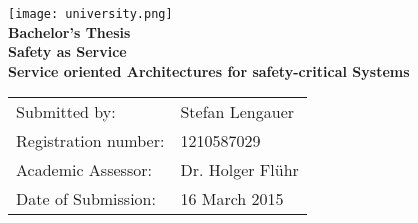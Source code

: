 \begin{titlepage}
	\begin{center}

		\texttt{[image: university.png]}\\
		\vspace*{5cm}
		\LARGE
		\textbf{Bachelor's Thesis}\\
		\vspace{1.5cm}
		\Huge
		\textbf{Safety as Service}\\
		\LARGE
		\textbf{Service oriented Architectures for safety-critical Systems}

		\vfill

		\large
		\begin{tabular}{ll}
			Submitted by:&Stefan Lengauer\\
			Registration number:&1210587029\\
			Academic Assessor:&Dr. Holger Flühr\\
			Date of Submission:&16 March 2015\\
		\end{tabular}
	\end{center}
\end{titlepage}